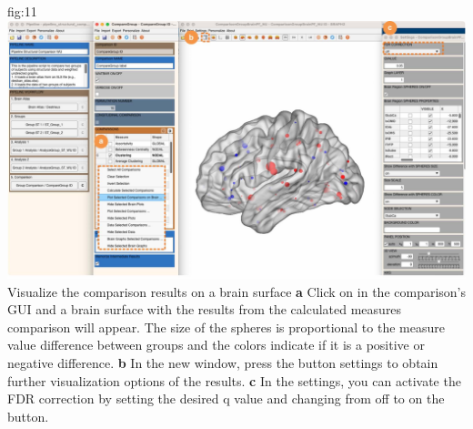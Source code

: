 \documentclass[justified]{tufte-handout}
\begin{document}
	{fig:11}
	{
	\includegraphics{fig11.jpg}
	}
 	{Visualize the comparison results on a brain surface}
 	{
 	{\bf a} Click on  in the comparison's GUI and a brain surface with the results from the calculated measures comparison will appear. The size of the spheres is proportional to the measure value difference between groups and the colors indicate if it is a positive or negative difference.   
        {\bf b} In the new window, press the button settings to obtain further visualization options of the results. 
        {\bf c} In the settings, you can activate the FDR correction by setting the desired q value and changing from off to on the button.
        }
\end{document}
